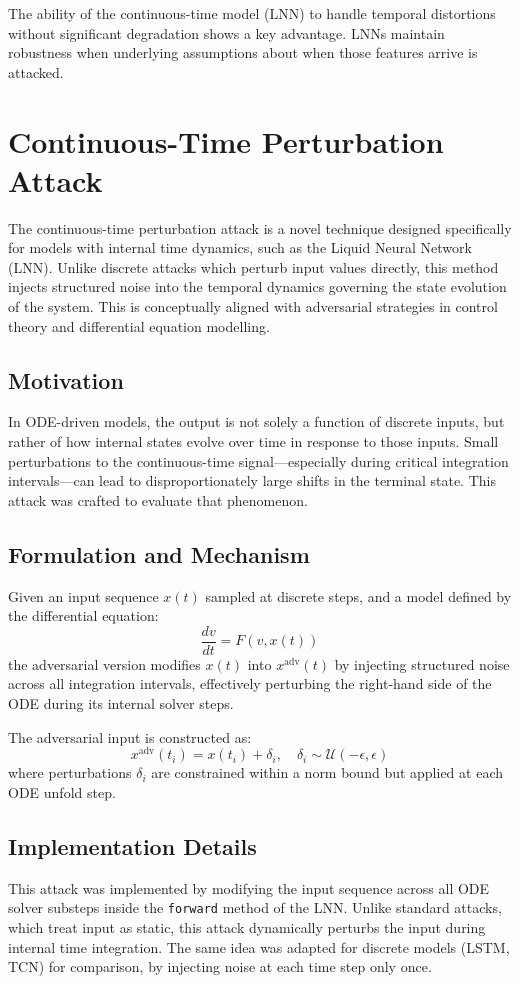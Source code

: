 The ability of the continuous-time model (LNN) to handle temporal distortions without significant degradation shows a key advantage. LNNs maintain robustness when underlying assumptions about when those features arrive is attacked.

\section{Continuous-Time Perturbation Attack}

The continuous-time perturbation attack is a novel technique designed specifically for models with internal time dynamics, such as the Liquid Neural Network (LNN). Unlike discrete attacks which perturb input values directly, this method injects structured noise into the temporal dynamics governing the state evolution of the system. This is conceptually aligned with adversarial strategies in control theory and differential equation modelling.

\subsection{Motivation}
In ODE-driven models, the output is not solely a function of discrete inputs, but rather of how internal states evolve over time in response to those inputs. Small perturbations to the continuous-time signal—especially during critical integration intervals—can lead to disproportionately large shifts in the terminal state. This attack was crafted to evaluate that phenomenon.

\subsection{Formulation and Mechanism}
Given an input sequence $x(t)$ sampled at discrete steps, and a model defined by the differential equation:
\[
\frac{dv}{dt} = F(v, x(t))
\]
the adversarial version modifies $x(t)$ into $x^{\text{adv}}(t)$ by injecting structured noise across all integration intervals, effectively perturbing the right-hand side of the ODE during its internal solver steps.

The adversarial input is constructed as:
\[
x^{\text{adv}}(t_i) = x(t_i) + \delta_i, \quad \delta_i \sim \mathcal{U}(-\epsilon, \epsilon)
\]
where perturbations $\delta_i$ are constrained within a norm bound but applied at each ODE unfold step.

\subsection{Implementation Details}
This attack was implemented by modifying the input sequence across all ODE solver substeps inside the \texttt{forward} method of the LNN. Unlike standard attacks, which treat input as static, this attack dynamically perturbs the input during internal time integration. The same idea was adapted for discrete models (LSTM, TCN) for comparison, by injecting noise at each time step only once.

